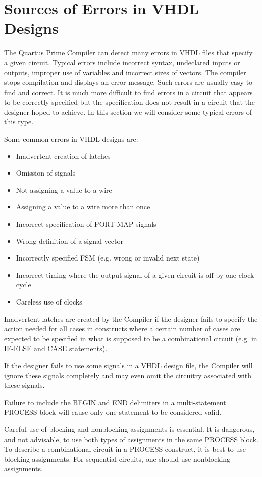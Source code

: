 \documentclass[11pt, twoside, pdftex]{article}
\begin{document}
\section{Sources of Errors in VHDL Designs}
The Quartus Prime Compiler can detect many errors in VHDL files that specify
a given circuit. Typical errors include incorrect syntax, undeclared inputs or 
outputs, improper use of variables and incorrect sizes of vectors.
The compiler stops compilation and displays an error message.
Such errors are usually easy to find and correct. It is much more difficult
to find errors in a circuit that appears to be correctly specified but the
specification does not result in a circuit that the designer hoped to achieve.  
In this section we will consider some typical errors of this type.

Some common errors in VHDL designs are:
\begin{itemize}
\item Inadvertent creation of latches
\item Omission of signals
\item Not assigning a value to a wire
\item Assigning a value to a wire more than once
\item Incorrect specification of PORT MAP signals
\item Wrong definition of a signal vector
\item Incorrectly specified FSM (e.g. wrong or invalid next state)
\item Incorrect timing where the output signal of a given circuit is off
by one clock cycle
\item Careless use of clocks
\end{itemize}

Inadvertent latches are created by the Compiler if the designer fails to
specify the action needed for all cases in constructs where a certain number
of cases are expected to be specified in what is supposed to be a
combinational circuit (e.g. in IF-ELSE and CASE statements). 

If the designer fails to use some signals in a VHDL design file, the
Compiler will ignore these signals completely and may even omit the
circuitry associated with these signals.

Failure to include the BEGIN and END delimiters in a multi-statement
PROCESS block will cause only one statement to be considered valid.

Careful use of blocking and nonblocking assignments is essential. It is
dangerous, and not advisable, to use both types of assignments in the
same PROCESS block. To describe a combinational circuit in a PROCESS
construct, it is best to use blocking assignments. For sequential circuits,
one should use nonblocking assignments.
\end{document}
